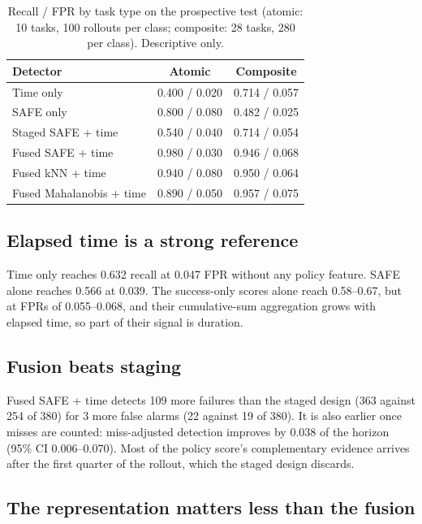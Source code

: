 \documentclass[conference,a4paper]{IEEEtran}
\begin{document}
\begin{table}[t]
\centering
\caption{Recall / FPR by task type on the prospective test (atomic: 10 tasks, 100 rollouts
per class; composite: 28 tasks, 280 per class). Descriptive only.}
\label{tab:strata}
\footnotesize
\begin{tabular}{@{}lcc@{}}
\toprule
Detector & Atomic & Composite \\
\midrule
Time only & 0.400 / 0.020 & 0.714 / 0.057 \\
SAFE only & 0.800 / 0.080 & 0.482 / 0.025 \\
Staged SAFE + time & 0.540 / 0.040 & 0.714 / 0.054 \\
Fused SAFE + time & 0.980 / 0.030 & 0.946 / 0.068 \\
Fused kNN + time & 0.940 / 0.080 & 0.950 / 0.064 \\
Fused Mahalanobis + time & 0.890 / 0.050 & 0.957 / 0.075 \\
\bottomrule
\end{tabular}
\end{table}



\subsection{Elapsed time is a strong reference}

Time only reaches 0.632 recall at 0.047 FPR without any policy feature. SAFE alone reaches
0.566 at 0.039. The success-only scores alone reach 0.58--0.67, but at FPRs of 0.055--0.068,
and their cumulative-sum aggregation grows with elapsed time, so part of their signal is
duration.

\subsection{Fusion beats staging}

Fused SAFE + time detects 109 more failures than the staged design (363 against 254 of 380)
for 3 more false alarms (22 against 19 of 380). It is also earlier once misses are counted:
miss-adjusted detection improves by 0.038 of the horizon (95\% CI 0.006--0.070). Most of the
policy score's complementary evidence arrives after the first quarter of the rollout, which
the staged design discards.

\subsection{The representation matters less than the fusion}
\end{document}
